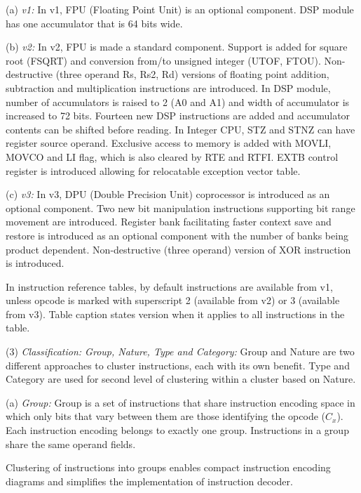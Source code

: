    \leveltwo
    (a) \emph{v1:} %
    In v1, FPU (Floating Point Unit) is an optional component. DSP module has one accumulator that is 
    64 bits wide.

    (b) \emph{v2:} %
    In v2, FPU is made a standard component. Support is added for square root (FSQRT) and conversion 
    from/to unsigned integer (UTOF, FTOU). Non-destructive (three operand Rs, Rs2, Rd) versions 
    of floating point addition, subtraction and multiplication instructions are introduced. In DSP module, 
    number of accumulators is raised to 2 (A0 and A1) and width of accumulator is increased to 72 bits. 
    Fourteen new DSP instructions are added and accumulator contents can be shifted before reading. 
    In Integer CPU, STZ and STNZ can have register source operand. Exclusive access to memory is 
    added with MOVLI, MOVCO and LI flag, which is also cleared by RTE and RTFI. EXTB control register is
    introduced allowing for relocatable exception vector table.

    (c) \emph{v3:} %
    In v3, DPU (Double Precision Unit) coprocessor is introduced as an optional component. Two new 
    bit manipulation instructions supporting bit range movement are introduced. Register bank 
    facilitating faster context save and restore is introduced as an optional component with the 
    number of banks being product dependent. Non-destructive (three operand) version of XOR instruction 
    is introduced.

\levelone
In instruction reference tables, by default instructions are available from v1, unless opcode 
is marked with superscript 2 (available from v2) or 3 (available from v3). Table caption states 
version when it applies to all instructions in the table.

(3) \emph{Classification: Group, Nature, Type and Category:} %
Group and Nature are two different approaches to cluster instructions, each with its own benefit.
Type and Category are used for second level of clustering within a cluster based on Nature.

    \leveltwo
    (a) \emph{Group:} %
    Group is a set of instructions that share instruction encoding space in which only bits that vary 
    between them are those identifying the opcode ($C_x$). Each instruction encoding belongs to 
    exactly one group. Instructions in a group share the same operand fields.
    
    Clustering of instructions into groups enables compact instruction encoding diagrams and 
    simplifies the implementation of instruction decoder.

